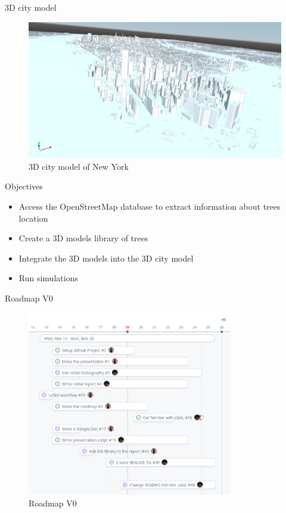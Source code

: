\documentclass[10pt]{beamer}
\begin{document}
\begin{frame}{3D city model}
  \begin{figure}[h] %
    \centering
    \includegraphics[width=1\textwidth]{images/NY_mesh.png}
    \caption{3D city model of New York \cite{NY-mesh}} %
    \label{fig:3d_city_model} %
  \end{figure} %
\end{frame}

\begin{frame}{Objectives}
  \begin{itemize}
    \item<1-> Access the OpenStreetMap database to extract information about trees location
    \item<2-> Create a 3D models library of trees
    \item<3-> Integrate the 3D models into the 3D city model
    \item<4-> Run simulations
  \end{itemize}
\end{frame}

\begin{frame}{Roadmap V0}
  \begin{figure}[h] %
    \centering
    \includegraphics[width=0.8\textwidth]{images/roadmap_v0.png}
    \caption{Roadmap V0} %
    \label{fig:roadmap_v0} %
    \end{figure}
\end{frame}
\end{document}

